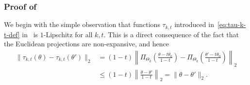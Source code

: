 \documentclass{article}
\theoremstyle{plain}
\theoremstyle{definition}
\newcommand{\lrp}[1]{\left( #1 \right)}
\begin{document}
\subsubsection{Proof of~}
\label{proof:approx-constraint-limiting-1}
We begin with the simple observation that functions $\tau_{k,t}$ introduced in~\eqref{eq:tau-k-t-def} in~ is $1$-Lipschitz for all $k,t$. This is a direct consequence of the fact that the Euclidean projections are non-expansive, and hence 
\begin{align}
    \|\tau_{k,t}(\theta) - \tau_{k,t}(\theta')\|_2  &= (1-t) \left\lVert  \Pi_{\Theta_k}\lrp{\frac{\theta - t \theta_0}{1-t}} - \Pi_{\Theta_k}\lrp{\frac{\theta' - t \theta_0}{1-t}} \right\rVert_2 \\
    & \leq (1-t) \left \lVert \frac{\theta - \theta'}{1-t} \right\rVert_2 = \|\theta - \theta'\|_2. \label{eq:lipschitz-property-of-identification-map}
\end{align}
\end{document}
